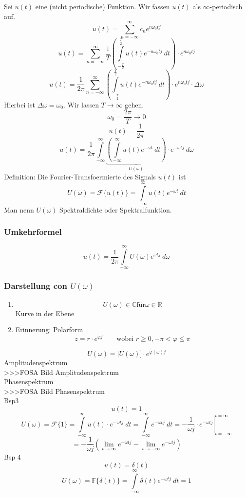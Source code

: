Sei $u(t)$ eine (nicht periodische) Funktion. Wir fassen $u(t)$ als 
$\infty$-periodisch auf. 
\[ u(t) = \sum\limits_{n = -\infty}^{\infty} c_n e^{n \omega_0 t j} \]
\[ u(t) = \sum\limits_{n = -\infty}^{\infty} \frac{1}{T} 
\left(\int\limits_{-\frac{T}{2}}^{\frac{T}{2}} u(t) e^{-n \omega_0 t j} ~ dt 
\right)\cdot  e^{n \omega_0 t j} \]
\[ u(t) = \frac{1}{2 \pi} \sum\limits_{n = -\infty}^{\infty}
\left(\int\limits_{-\frac{T}{2}}^{\frac{T}{2}} u(t) e^{-n \omega_0 t j} ~ dt 
\right)\cdot  e^{n \omega_0 t j} \cdot \Delta \omega \]
Hierbei ist $\Delta \omega = \omega_0$. Wir lassen $T \to \infty$ gehen. 
\[ \omega_0 = \frac{2 \pi}{T} \to 0 \]
\[ u(t) = \frac{1}{2 \pi} \]
\[ u(t) = \frac{1}{2 \pi} \int\limits_{-\infty}^{\infty}
\underbrace{\left(\int\limits_{-\infty}^{\infty} u(t) e^{-\omega t} ~ dt 
\right)}_{U(\omega)}\cdot  e^{-\omega t j} ~ d\omega \]
Definition: Die Fourier-Transfoermierte des Signals $u(t)$ ist 
\[ U(\omega) = \mathcal{F}\{ u(t) \} = \int\limits_{-\infty}^{\infty} 
u(t) e^{-\omega t} ~dt \]
Man nenn $U(\omega)$ Spektraldichte oder Spektralfunktion. 

\subsubsection{Umkehrformel}
\[ u(t) = \frac{1}{2 \pi} \int\limits_{-\infty}^{\infty} 
U(\omega) e^{\omega t j} ~ d\omega \]

\subsubsection{Darstellung con $U(\omega)$}
\begin{enumerate}
\item \[ U(\omega) \in \mathbb{C} \text{für} \omega \in \mathbb{R} \]
Kurve in der Ebene
\item Erinnerung: Polarform
\[ z = r \cdot e^{\varphi j} 
\qquad \text{wobei }r \geq 0, -\pi < \varphi \leq \pi \]
\end{enumerate}
\[ U(\omega) = |U(\omega)] \cdot e^{\varphi(\omega) j} \]
Amplitudenspektrum\\
>>>FOSA Bild Amplitudenspektrum\\
Phasenspektrum\\
>>>FOSA Bild Phasenspektrum\\
Bsp3
\[ u(t) = 1 \]
\[ U(\omega) = \mathcal{F}\{1\} 
= \int\limits_{-\infty}^{\infty} u(t) \cdot e^{-\omega t j} ~ dt 
= \int\limits_{-\infty}^{\infty} e^{-\omega t j} ~ dt 
= \left.-\frac{1}{\omega j} \cdot e^{-\omega t j}\right|
_{t = -\infty}^{t = \infty} \]
\[ = -\frac{1}{\omega j} \left(\lim\limits_{t \to \infty} e^{-\omega t j} 
- \lim\limits_{t \to -\infty} e^{-\omega t j}\right) \]
Bsp 4
\[ u(t) = \delta(t) \]
\[ U(\omega) = \mathbb{F}\{\delta (t)\} = \int\limits_{-\infty}^{\infty} 
\delta (t) e^{-\omega t j} ~dt = 1 \]
